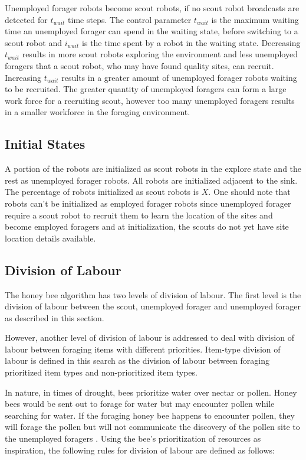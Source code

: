 Unemployed forager robots become scout robots, if no scout robot broadcasts are detected for $t_{wait}$ time steps. The control parameter $t_{wait}$ is the maximum waiting time an unemployed forager can spend in the waiting state, before switching to a scout robot and $i_{wait}$ is the time spent by a robot in the waiting state. Decreasing $t_{wait}$ results in more scout robots exploring the environment and less unemployed foragers that a scout robot, who may have found quality sites, can recruit. Increasing $t_{wait}$ results in a greater amount of unemployed forager robots waiting to be recruited. The greater quantity of unemployed foragers can form a large work force for a recruiting scout, however too many unemployed foragers results in a smaller workforce in the foraging environment.

\subsection{Initial States}

A portion of the robots are initialized as scout robots in the explore state and the rest as unemployed forager robots. All robots are initialized adjacent to the sink. The percentage of robots initialized as scout robots is $X$. One should note that robots can't be initialized as employed forager robots since unemployed forager require a scout robot to recruit them to learn the location of the sites and become employed foragers and at initialization, the scouts do not yet have site location details available.

\subsection{Division of Labour}
The honey bee algorithm has two levels of division of labour. The first level is the division of labour between the scout, unemployed forager and unemployed forager as described in this section.

However, another level of division of labour is addressed to deal with division of labour between foraging items with different priorities. Item-type division of labour is defined in this search as the division of labour between foraging prioritized item types and non-prioritized item types.

In nature, in times of drought, bees prioritize water over nectar or pollen. Honey bees would be sent out to forage for water but may encounter pollen while searching for water. If the foraging honey bee happens to encounter pollen, they will forage the pollen but will not communicate the discovery of the pollen site to the unemployed foragers \cite{seeley2009wisdom}. Using the bee's prioritization of resources as inspiration, the following rules for division of labour are defined as follows:

